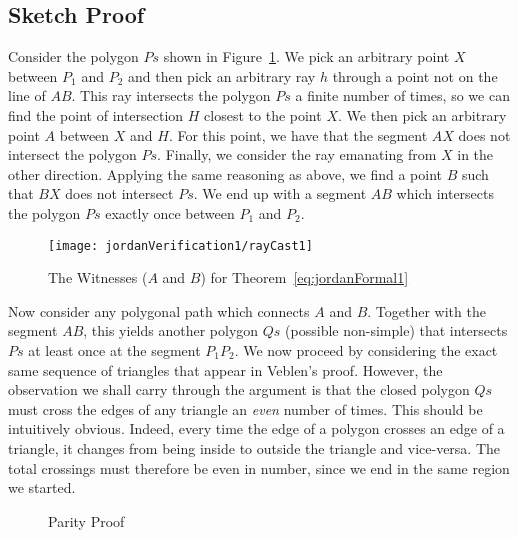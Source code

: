 \subsection{Sketch Proof}\label{sec:ParityProofInformal}
Consider the polygon $Ps$ shown in Figure~\ref{fig:rayCast1}. We pick an arbitrary point $X$ between $P_1$ and $P_2$  and then pick an arbitrary ray $h$ through a point not on the line of $AB$. This ray intersects the polygon $Ps$ a finite number of times, so we can find the point of intersection $H$ closest to the point $X$. We then pick an arbitrary point $A$ between $X$ and $H$. For this point, we have that the segment $AX$ does not intersect the polygon $Ps$. Finally, we consider the ray emanating from $X$ in the other direction. Applying the same reasoning as above, we find a point $B$ such that $BX$ does not intersect $Ps$. We end up with a segment $AB$ which intersects the polygon $Ps$ exactly once between $P_1$ and $P_2$.

\begin{figure}
\centering\texttt{[image: jordanVerification1/rayCast1]}
\caption{The Witnesses ($A$ and $B$) for Theorem~\ref{eq:jordanFormal1}}
\label{fig:rayCast1}
\end{figure}

\newcommand{\insideoutsideclaim}{every time the edge of a polygon crosses an edge of a triangle, it changes from being inside to outside the triangle and vice-versa}

Now consider any polygonal path which connects $A$ and $B$. Together with the segment $AB$, this yields another polygon $Qs$ (possible non-simple) that intersects $Ps$ at least once at the segment $P_1P_2$. We now proceed by considering the exact same sequence of triangles that appear in Veblen's proof. However, the observation we shall carry through the argument is that the closed polygon $Qs$ must cross the edges of any triangle an \emph{even} number of times. This should be intuitively obvious. Indeed, \insideoutsideclaim. The total crossings must therefore be even in number, since we end in the same region we started.

\begin{figure}
\caption{Parity Proof}
\label{fig:ParityProof}
\end{figure}

